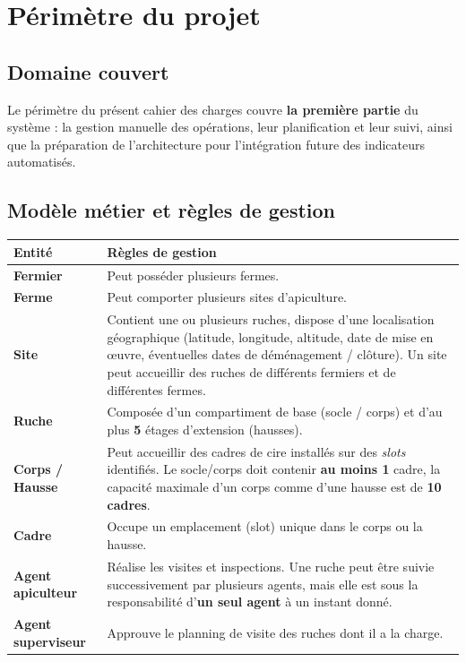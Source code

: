 \chapter{Périmètre du projet}

\section{Domaine couvert}
Le périmètre du présent cahier des charges couvre \textbf{la première partie}
du système : la gestion manuelle des opérations, leur planification et leur
suivi, ainsi que la préparation de l'architecture pour l'intégration future
des indicateurs automatisés.

\section{Modèle métier et règles de gestion}
\begin{xltabular}{\textwidth}{>{\bfseries}p{3cm} X}
\toprule
\textbf{Entité} & \textbf{Règles de gestion} \\
\midrule
\endhead
Fermier   & Peut posséder plusieurs fermes. \\
Ferme     & Peut comporter plusieurs sites d'apiculture. \\
Site      & Contient une ou plusieurs ruches, dispose d'une localisation géographique (latitude, longitude, altitude, date de mise en œuvre, éventuelles dates de déménagement / clôture). Un site peut accueillir des ruches de différents fermiers et de différentes fermes. \\
Ruche     & Composée d'un compartiment de base (socle / corps) et d'au plus \textbf{5} étages d'extension (hausses). \\
Corps / Hausse & Peut accueillir des cadres de cire installés sur des \emph{slots} identifiés. Le socle/corps doit contenir \textbf{au moins 1} cadre, la capacité maximale d'un corps comme d'une hausse est de \textbf{10 cadres}. \\
Cadre     & Occupe un emplacement (slot) unique dans le corps ou la hausse. \\
Agent apiculteur & Réalise les visites et inspections. Une ruche peut être suivie successivement par plusieurs agents, mais elle est sous la responsabilité d'\textbf{un seul agent} à un instant donné. \\
Agent superviseur & Approuve le planning de visite des ruches dont il a la charge. \\
\bottomrule
\end{xltabular}

